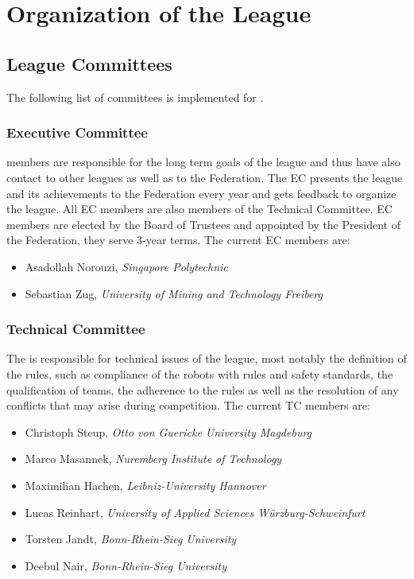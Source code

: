 \section{Organization of the League}\label{sec:organisation_of_the_league}

\subsection{League Committees}
The following list of committees is implemented for \RCAW.

\subsubsection{Executive Committee}

 members are responsible for the long term goals of the league and thus have also contact to other leagues as well as to the \RC Federation. The EC presents the league and its achievements to the \RC Federation every year and gets feedback to organize the league. All EC members are also members of the Technical Committee. EC members are elected by the Board of Trustees and appointed by the President of the \RC Federation, they serve 3-year terms. The current EC members are:

\begin{itemize}
	\item Asadollah Norouzi, \textit{Singapore Polytechnic}
	\item Sebastian Zug, \textit{University of Mining and Technology Freiberg}
\end{itemize}


\subsubsection{Technical Committee}
The  is responsible for technical issues of the league, most notably the definition of the rules, such as compliance of the robots with rules and safety standards, the qualification of teams, the adherence to the rules as well as the resolution of any conflicts that may arise during competition. The current TC members are:


\begin{itemize}
    \item Christoph Steup, \textit{Otto von Guericke University Magdeburg}
    \item Marco Masannek, \textit{Nuremberg Institute of Technology}
	\item Maximilian Hachen, \textit{Leibniz-University Hannover}
	\item Lucas Reinhart, \textit{University of Applied Sciences Würzburg-Schweinfurt}
		\item Torsten Jandt, \textit{Bonn-Rhein-Sieg University}
    \item Deebul Nair, \textit{Bonn-Rhein-Sieg University}
    
\end{itemize}


